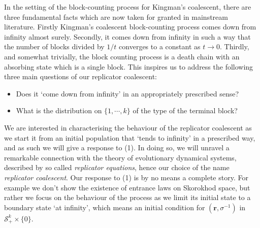 \documentclass[12pt, leqno]{article}
\begin{document}




\medskip

In the setting of the block-counting process for Kingman's coalescent, there are three fundamental facts which are now taken for granted in mainstream literature. Firstly Kingman's coalescent block-counting process  comes down from infinity almost surely. Secondly, it comes down from infinity in such a way that the number of blocks divided by $1/t$ converges to a constant as $t\to0$. Thirdly, and somewhat trivially, the block counting process is a death chain with  an absorbing state which is a single block.
This inspires us to address  the following three main questions of our replicator coalescent:


\begin{itemize}
\item[(1)] Does it `come down from infinity' in an appropriately prescribed sense?
\item[(2)] What is the distribution on $\{1,\cdots, k\}$ of the type of the terminal block?

\end{itemize}

We are interested in characterising the behaviour of the replicator coalescent as we start it from an initial population that `tends to infinity' in a prescribed way, and as such we will give a response to (1).
In doing so, we will unravel a remarkable connection with the theory of evolutionary dynamical systems, described by so called {\it replicator equations}, hence our choice of the name {\it replicator coalescent}. Our response to (1) is by no means a complete story. For example we  don't show the existence of entrance laws on Skorokhod space, but rather we focus on the behaviour of the process as we limit its initial state to a boundary state `at infinity', which means an initial condition for $( \bm r, \sigma^{-1})$ in $\mathcal{S}^k_+\times \{0\}$. 
\end{document}
